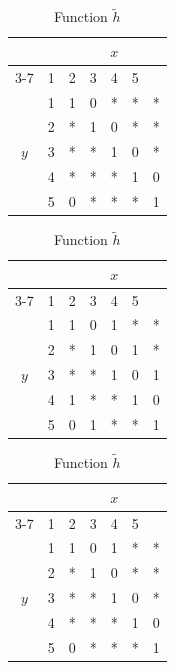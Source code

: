 \documentclass[journal, onecolumn, draftcls]{IEEEtran}
\theoremstyle{definition}
\begin{document}
\begin{table}[t]
\centering 
\begin{minipage}{.32\textwidth}
  \centering
  \begin{tabular}{c|c|ccccc}
    \multicolumn{2}{c|}{} & \multicolumn{5}{c}{\( x \)} \\
    \cline{3-7}
    \multicolumn{2}{c|}{\multirow{-2}{*}{\( \tilde f(x,y) \)}} & 1 & 2 & 3 & 4 & 5 \\
    \hline
    \multirow{5}{*}{\( y \)} 
    & 1 & 1 & 0 & * & * & * \\
    & 2 & * & 1 & 0 & * & * \\
    & 3 & * & * & 1 & 0 & * \\
    & 4 & * & * & * & 1 & 0 \\
    & 5 & 0 & * & * & * & 1 
  \end{tabular}
  \caption{Function $\tilde f$}
  \label{table:simple_eg1}
\end{minipage}%
\begin{minipage}{.32\textwidth}
  \centering
  \begin{tabular}{c|c|ccccc}
    \multicolumn{2}{c|}{} & \multicolumn{5}{c}{\( x \)} \\
    \cline{3-7}
    \multicolumn{2}{c|}{\multirow{-2}{*}{\( \tilde g(x,y) \)}} & 1 & 2 & 3 & 4 & 5 \\
    \hline
    \multirow{5}{*}{\( y \)} 
    & 1 & 1 & 0 & 1 & * & * \\
    & 2 & * & 1 & 0 & 1 & * \\
    & 3 & * & * & 1 & 0 & 1 \\
    & 4 & 1 & * & * & 1 & 0 \\
    & 5 & 0 & 1 & * & * & 1 
  \end{tabular}
  \caption{Function $\tilde g$}
  \label{table:simple_eg2}
\end{minipage} 
\begin{minipage}{.32\textwidth}
  \centering
  \begin{tabular}{c|c|ccccc}
    \multicolumn{2}{c|}{} & \multicolumn{5}{c}{\( x \)} \\
    \cline{3-7}
    \multicolumn{2}{c|}{\multirow{-2}{*}{\(\tilde  h(x,y) \)}} & 1 & 2 & 3 & 4 & 5 \\
    \hline
    \multirow{5}{*}{\( y \)} 
    & 1 & 1 & 0 & 1 & * & * \\
    & 2 & * & 1 & 0 & * & * \\
    & 3 & * & * & 1 & 0 & * \\
    & 4 & * & * & * & 1 & 0 \\
    & 5 & 0 & * & * & * & 1 
  \end{tabular}
  \caption{Function $\tilde h$}
  \label{table:simple_eg3}
\end{minipage}%
\end{table}  
\end{document}
